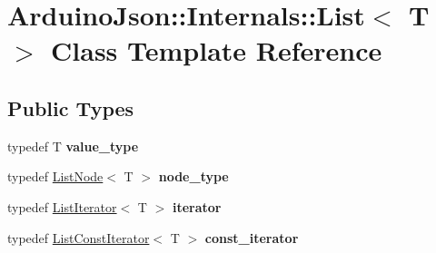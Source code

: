 \hypertarget{class_arduino_json_1_1_internals_1_1_list}{}\section{Arduino\+Json\+:\+:Internals\+:\+:List$<$ T $>$ Class Template Reference}
\label{class_arduino_json_1_1_internals_1_1_list}
\subsection*{Public Types}
\begin{DoxyCompactItemize}
\item 
\hypertarget{class_arduino_json_1_1_internals_1_1_list_a9629d1339871e0c62b620cff9936648d}{}typedef T {\bfseries value\+\_\+type}\label{class_arduino_json_1_1_internals_1_1_list_a9629d1339871e0c62b620cff9936648d}

\item 
\hypertarget{class_arduino_json_1_1_internals_1_1_list_a3bdd86651c7dae3d324a79e73bd35809}{}typedef \hyperlink{struct_arduino_json_1_1_internals_1_1_list_node}{List\+Node}$<$ T $>$ {\bfseries node\+\_\+type}\label{class_arduino_json_1_1_internals_1_1_list_a3bdd86651c7dae3d324a79e73bd35809}

\item 
\hypertarget{class_arduino_json_1_1_internals_1_1_list_afba367ba4c70cf65e53e5dceeaf96e01}{}typedef \hyperlink{class_arduino_json_1_1_internals_1_1_list_iterator}{List\+Iterator}$<$ T $>$ {\bfseries iterator}\label{class_arduino_json_1_1_internals_1_1_list_afba367ba4c70cf65e53e5dceeaf96e01}

\item 
\hypertarget{class_arduino_json_1_1_internals_1_1_list_a647f2c3de1b3810ca31c9041395e83f9}{}typedef \hyperlink{class_arduino_json_1_1_internals_1_1_list_const_iterator}{List\+Const\+Iterator}$<$ T $>$ {\bfseries const\+\_\+iterator}\label{class_arduino_json_1_1_internals_1_1_list_a647f2c3de1b3810ca31c9041395e83f9}

\end{DoxyCompactItemize}
